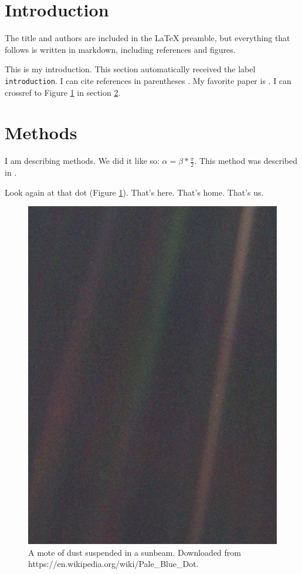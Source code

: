 \hypertarget{introduction}{%
\section{Introduction}\label{introduction}}

The title and authors are included in the LaTeX preamble, but everything
that follows is written in markdown, including references and figures.

This is my introduction. This section automatically received the label
\texttt{introduction}. I can cite references in parentheses
\citep[see][]{bainbridgeResiliencyImageMemorability2020}. My favorite
paper is \citet{adrianBergerRhythmPotential1934}. I can crossref to
Figure \ref{paleblue} in section \ref{methods}.

\hypertarget{methods}{%
\section{Methods}\label{methods}}

I am describing methods. We did it like so:
\(\alpha=\beta * \frac{\pi}{2}\). This method was described in
\citet{michelDistinctContributions2021}.

Look again at that dot (Figure \ref{paleblue}). That's here. That's
home. That's us.

\begin{figure}
\centering
\includegraphics[width=\textwidth,height=0.5\textheight]{Pale_Blue_Dot.png}
\caption{A mote of dust suspended in a sunbeam. Downloaded from
https://en.wikipedia.org/wiki/Pale\_Blue\_Dot. \label{paleblue}}
\end{figure}

